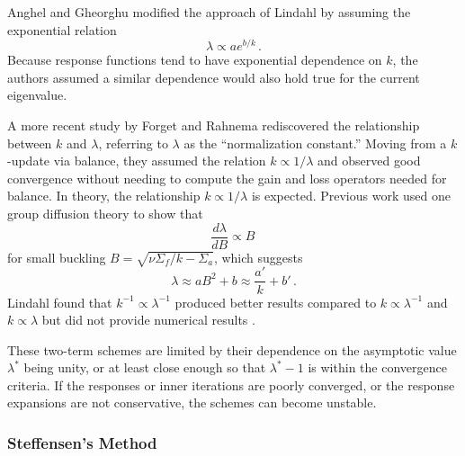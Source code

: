 Anghel and Gheorghu \cite{anghel1987isr}
modified the approach of Lindahl by assuming the 
exponential relation
\begin{equation}
  \lambda \propto a e^{b/k} \, .
\end{equation}
Because response functions tend to have exponential dependence on 
$k$, the authors assumed a similar dependence would also hold true for 
the current eigenvalue. 

A more recent study by Forget and Rahnema \cite{forget2005nee} 
rediscovered the relationship
between $k$ and $\lambda$, referring to $\lambda$ as
the ``normalization constant.''
Moving from a $k$-update via balance, they assumed the relation 
$k \propto 1/\lambda$ and observed good convergence without 
needing to compute the gain and loss operators needed for balance.  
In theory, the relationship $k \propto 1/\lambda$ is expected.  
Previous work \cite{roberts2014cer} used one group diffusion 
theory to show that 
\begin{equation}
 \frac{d \lambda}{d B} \propto  B \, 
\end{equation}
for small
buckling $B = \sqrt{\nu \Sigma_f/k - \Sigma_a}$, which
suggests
\begin{equation}
 \lambda \approx  a B^2 + b \approx \frac{a'}{k} + b' \, .
\end{equation}
Lindahl found that $k^{-1} \propto \lambda^{-1}$ produced better results
compared to  $k \propto \lambda^{-1}$ and $k \propto \lambda$ but
did not provide numerical results \cite{lindahl1976mdr}.

These two-term schemes are limited by their
dependence on the asymptotic value $\lambda^*$ being unity, or at least 
close enough so that $\lambda^*-1$ is within the convergence 
criteria.  If the responses or inner iterations are poorly converged, or
the response expansions are not conservative, the 
schemes can become unstable.

\subsubsection{Steffensen's Method}
\label{sec:steffensensmethod}

